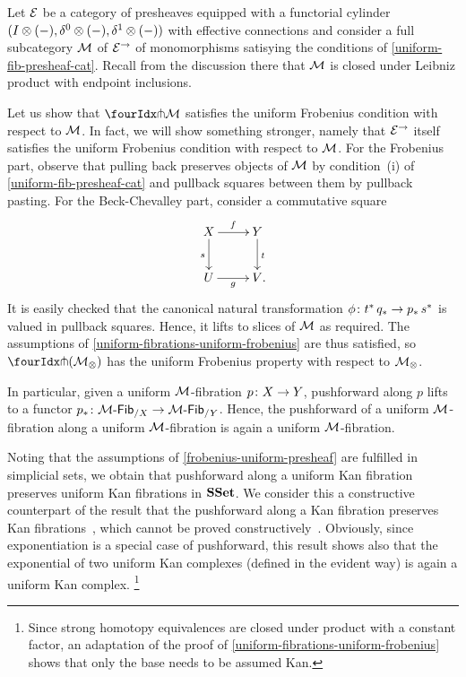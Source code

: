 \documentclass[reqno,10pt,a4paper,oneside,draft]{amsart}
\begin{document}
\begin{example} \label{frobenius-uniform-presheaf}
Let $\catE$ be a category of presheaves equipped with a functorial cylinder $(\interval \otimes (-), \lcyl \otimes (-), \rcyl \otimes (-))$ with effective connections and consider a full subcategory $\cal{M}$ of $\catE^\to$ of monomorphisms satisying the conditions of \cref{uniform-fib-presheaf-cat}.
Recall from the discussion there that $\cal{M}$ is closed under Leibniz product with endpoint inclusions.

Let us show that $\liftr{\cal{M}}$ satisfies the uniform Frobenius condition with respect to $\cal{M}$.
In fact, we will show something stronger, namely that $\catE^\to$ itself satisfies the uniform Frobenius condition with respect to $\cal{M}$.
For the Frobenius part, observe that pulling back preserves objects of $\cal{M}$ by condition~(i) of \cref{uniform-fib-presheaf-cat} and pullback squares between them by pullback pasting.
For the Beck-Chevalley part, consider a commutative square
\[
\xymatrix{
  X
  \ar[r]^{f}
  \ar[d]_{s}
&
  Y
  \ar[d]^{t}
\\
  U
  \ar[r]_{g}
&
  V
\rlap{.}}
\]
It is easily checked that the canonical natural transformation $\phi \co t^* \, q_* \to p_* \, s^*$ is valued in pullback squares.
Hence, it lifts to slices of $\cal{M}$ as required.
The assumptions of \cref{uniform-fibrations-uniform-frobenius} are thus satisfied, so $\liftr{(\cal{M}_\otimes)}$ has the uniform Frobenius property with respect to $\cal{M}_\otimes$.

In particular, given a uniform $\cal{M}$-fibration $p \co X \to Y$, pushforward along $p$ lifts to a functor $p_* \co \Fib{\cal{M}}_{/X} \to \Fib{\cal{M}}_{/Y}$.
Hence, the pushforward of a uniform $\cal{M}$-fibration along a uniform $\cal{M}$-fibration is again a uniform $\cal{M}$-fibration.
\end{example}

\begin{example}
Noting that the assumptions of \cref{frobenius-uniform-presheaf} are fulfilled in simplicial sets, we obtain that pushforward along a uniform Kan fibration preserves uniform Kan fibrations in $\SSet$.
We consider this a constructive counterpart of the result that the pushforward along a Kan fibration preserves Kan fibrations~\cite{voevodsky-simplicial-model}, which cannot be proved constructively~\cite{coquand-non-constructivity-kan}.
Obviously, since exponentiation is a special case of pushforward, this result shows also that the exponential of two uniform Kan complexes (defined in the evident way) is again a uniform Kan complex.%
\footnote{Since strong homotopy equivalences are closed under product with a constant factor, an adaptation of the proof of \cref{uniform-fibrations-uniform-frobenius} shows that only the base needs to be assumed Kan.}
\end{example}
\end{document}

